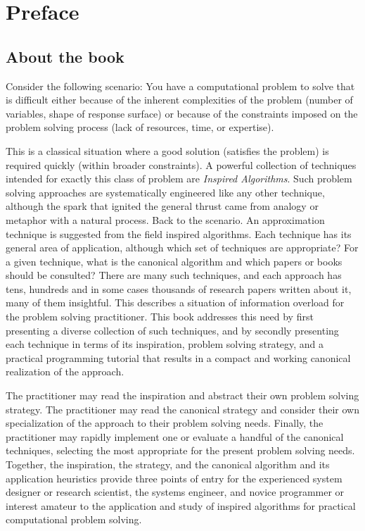 \chapter*{Preface}

\section*{About the book}
Consider the following scenario: You have a computational problem to solve that is difficult either because of the inherent complexities of the problem (number of variables, shape of response surface) or because of the constraints imposed on the problem solving process (lack of resources, time, or expertise). 

This is a classical situation where a good solution (satisfies the problem) is required quickly (within broader constraints). A powerful collection of techniques intended for exactly this class of problem are \textit{Inspired Algorithms}. Such problem solving approaches are systematically engineered like any other technique, although the spark that ignited the general thrust came from analogy or metaphor with a natural process. Back to the scenario. An approximation technique is suggested from the field inspired algorithms. Each technique has its general area of application, although which set of techniques are appropriate? For a given technique, what is the canonical algorithm and which papers or books should be consulted? There are many such techniques, and each approach has tens, hundreds and in some cases thousands of research papers written about it, many of them insightful. This describes a situation of information overload for the problem solving practitioner. This book addresses this need by first presenting a diverse collection of such techniques, and by secondly presenting each technique in terms of its inspiration, problem solving strategy, and a practical programming tutorial that results in a compact and working canonical realization of the approach. 

The practitioner may read the inspiration and abstract their own problem solving strategy. The practitioner may read the canonical strategy and consider their own specialization of the approach to their problem solving needs. Finally, the practitioner may rapidly implement one or evaluate a handful of the canonical techniques, selecting the most appropriate for the present problem solving needs. Together, the inspiration, the strategy, and the canonical algorithm and its application heuristics provide three points of entry for the experienced system designer or research scientist, the systems engineer, and novice programmer or interest amateur to the application and study of inspired algorithms for practical computational problem solving.

